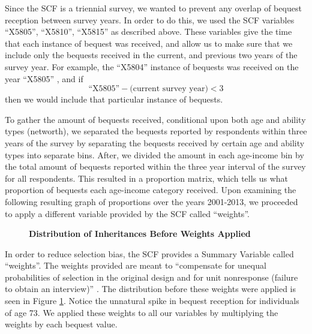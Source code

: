 \documentclass[letterpaper,12pt]{article}
\newcommand{\quotes}[1]{``#1''}
\theoremstyle{definition}
\begin{document}
\begin{spacing}{1.5}
  Since the SCF is a triennial survey, we wanted to prevent any overlap of bequest reception between survey years. In order to do this, we used the SCF variables \quotes{X5805}, \quotes{X5810}, \quotes{X5815} as described above. These variables give the time that each instance of bequest was received, and allow us to make sure that we include only the bequests received in the current, and previous two years of the survey year. For example, the \quotes{X5804} instance of bequests was received on the year \quotes{X5805} , and if
  \[\text{\quotes{X5805}} - \text{(current~survey~year)} <3\]
  then we would include that particular instance of bequests.

  To gather the amount of bequests received, conditional upon both age and ability types (networth), we separated the bequests reported by respondents within three years of the survey by separating the bequests received by certain age and ability types into separate bins. After, we divided the amount in each age-income bin by the total amount of bequests reported within the three year interval of the survey for all respondents. This resulted in a proportion matrix, which tells us what proportion of bequests each age-income category received. Upon examining the following resulting graph of proportions over the years 2001-2013, we proceeded to apply a different variable provided by the SCF called \quotes{weights}.

  \begin{figure}[htbp]\centering \captionsetup{width=5.5in}
      \caption{\label{Weightfig}\textbf{Distribution of Inheritances Before Weights Applied}}
    \end{figure}
  \newpage

  In order to reduce selection bias, the SCF provides a Summary Variable called \quotes{weights}. The weights provided are meant to \quotes{compensate for unequal probabilities of selection in the original design and for unit nonresponse (failure to obtain an interview)} \citet{FEDweight}. The distribution before these weights were applied is seen in Figure \ref{Weightfig}. Notice the unnatural spike in bequest reception for individuals of age 73. We applied these weights to all our variables by multiplying the weights by each bequest value.


\end{spacing}
\end{document}
